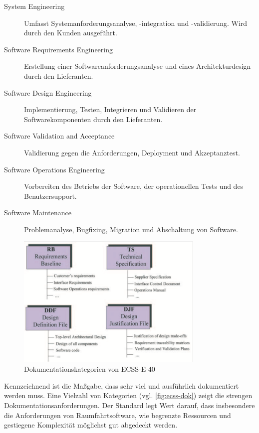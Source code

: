 \begin{description}
\item[System Engineering] Umfasst Systemanforderungsanalyse, -integration und -validierung. 
Wird durch den Kunden ausgeführt.
\item[Software Requirements Engineering] Erstellung einer Softwareanforderungsanalyse und eines Architekturdesign durch den Lieferanten.
\item[Software Design Engineering] Implementierung, Testen, Integrieren und Validieren der Softwarekomponenten durch den Lieferanten.
\item[Software Validation and Acceptance] Validierung gegen die Anforderungen, Deployment und Akzeptanztest.
\item[Software Operations Engineering] Vorbereiten des Betriebs der Software, der operationellen Tests und des Benutzersupport.
\item[Software Maintenance] Problemanalyse, Bugfixing, Migration und Abschaltung von Software.
\end{description}

\begin{figure}
  \centering
  \includegraphics[width=0.8\textwidth]{img/ecss-dokumentation.png}
  \caption{Dokumentationskategorien von ECSS-E-40 \parencite[][S. 136]{jones2002introducing}}
  \label{fig:ecss-dok}
\end{figure}

Kennzeichnend ist die Maßgabe, dass sehr viel und ausführlich dokumentiert werden muss.
Eine Vielzahl von Kategorien (vgl. \autoref{fig:ecss-dok}) zeigt die strengen Dokumentationsanforderungen.
Der Standard legt Wert darauf, dass insbesondere die Anforderungen von Raumfahrtsoftware, wie begrenzte Ressourcen und gestiegene Komplexität möglichst gut abgedeckt werden.
\parencite[Vgl.][]{jones2002introducing}

